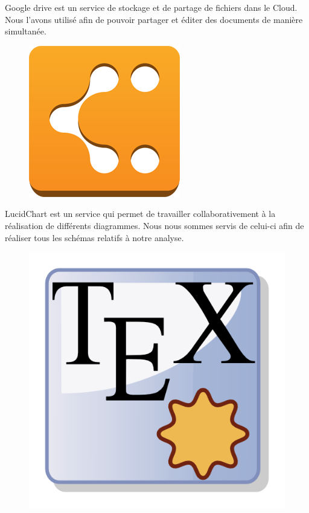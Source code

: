 ﻿\documentclass[17pts]{report}
\begin{document}
Google drive est un service de stockage et de partage de fichiers dans le
Cloud. Nous l'avons utilisé afin de pouvoir partager et éditer des documents de
manière simultanée.\\

\begin{figure}[H]
    \includegraphics[scale=0.15]{illustrations/lucidchart.png}
    \centering
\end{figure}

LucidChart est un service qui permet de travailler collaborativement à la
réalisation de différents diagrammes. Nous nous sommes servis de celui-ci afin
de réaliser tous les schémas relatifs à notre analyse.\\

\begin{figure}[H]
    \includegraphics[scale=1.1]{illustrations/texmaker.png}
    \centering
\end{figure}
\end{document}
